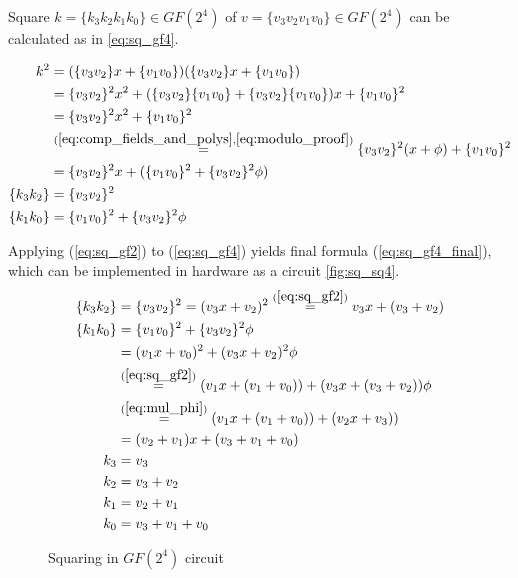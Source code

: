 Square $k = \{k_3k_2k_1k_0\} \in GF(2^4)$ of $v = \{v_3v_2v_1v_0\} \in GF(2^4)$ can be calculated as in \ref{eq:sq_gf4}.

\begin{equation}
\label{eq:sq_gf4}
\begin{aligned}
k^2 &= (\{v_3v_2\}x + \{v_1v_0\})(\{v_3v_2\}x + \{v_1v_0\})\\
&= \{v_3v_2\}^2x^2 + (\{v_3v_2\}\{v_1v_0\} + \{v_3v_2\}\{v_1v_0\})x + \{v_1v_0\}^2 \\
&= \{v_3v_2\}^2x^2 + \{v_1v_0\}^2 \\
&\stackrel{(\ref{eq:comp_fields_and_polys}, \ref{eq:modulo_proof})}{=}
\{v_3v_2\}^2(x + \phi) + \{v_1v_0\}^2 \\
&= \{v_3v_2\}^2x + (\{v_1v_0\}^2 + \{v_3v_2\}^2\phi)\\
\{k_3k_2\} &= \{v_3v_2\}^2 \\
\{k_1k_0\} &= \{v_1v_0\}^2 + \{v_3v_2\}^2\phi
\end{aligned}
\end{equation}

Applying (\ref{eq:sq_gf2}) to (\ref{eq:sq_gf4}) yields final formula (\ref{eq:sq_gf4_final}), which can be implemented in hardware as a circuit \ref{fig:sq_sq4}.
\begin{equation}
\label{eq:sq_gf4_final}
\begin{aligned}
\{k_3k_2\} &= \{v_3v_2\}^2 = (v_3x + v_2)^2
\stackrel{(\ref{eq:sq_gf2})}{=}
v_3x + (v_3 + v_2)\\
\{k_1k_0\} &= \{v_1v_0\}^2 + \{v_3v_2\}^2\phi \\
&= (v_1x + v_0)^2 + (v_3x + v_2)^2\phi \\
&\stackrel{(\ref{eq:sq_gf2})}{=}
(v_1x + (v_1 + v_0)) + (v_3x + (v_3 + v_2))\phi \\
&\stackrel{(\ref{eq:mul_phi})}{=}
(v_1x + (v_1 + v_0)) + (v_2x + v_3)) \\
&= (v_2 + v_1)x + (v_3 + v_1 + v_0) \\
k_3 &= v_3 \\
k_2 &= v_3 + v_2 \\
k_1 &= v_2 + v_1 \\
k_0 &= v_3 + v_1 + v_0
\end{aligned}
\end{equation}

\begin{figure}[!h]
\label{fig:mul_sq4}
\missingfigure[figwidth=6cm]{}
\caption{Squaring in $GF(2^4)$ circuit}
\end{figure}






\newpage
